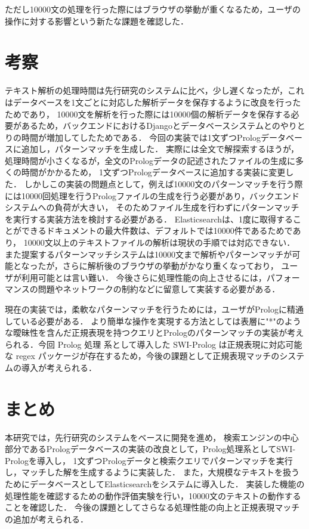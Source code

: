 \documentclass{FITpaper}
\begin{document}
  ただし10000文の処理を行った際にはブラウザの挙動が重くなるため，ユーザの操作に対する影響という新たな課題を確認した．
  
\section{考察}
  テキスト解析の処理時間は先行研究のシステムに比べ，少し遅くなったが，これはデータベースを1文ごとに対応した解析データを保存するように改良を行ったためであり，
  10000文を解析を行った際には10000個の解析データを保存する必要があるため，バックエンドにおけるDjangoとデータベースシステムとのやりとりの時間が増加してしたためである．
  今回の実装では1文ずつPrologデータベースに追加し，パターンマッチを生成した．
  実際には全文で解探索するほうが，処理時間が小さくなるが，全文のPrologデータの記述されたファイルの生成に多くの時間がかかるため，
  1文ずつPrologデータベースに追加する実装に変更した．
  しかしこの実装の問題点として，例えば10000文のパターンマッチを行う際には10000回処理を行うPrologファイルの生成を行う必要があり，バックエンドシステムへの負荷が大きい，
  そのためファイル生成を行わずにパターンマッチを実行する実装方法を検討する必要がある．
  Elasticsearchは、1度に取得することができるドキュメントの最大件数は、デフォルトでは10000件であるためであり，
  10000文以上のテキストファイルの解析は現状の手順では対応できない．
  また提案するパターンマッチシステムは10000文まで解析やパターンマッチが可能となったが，さらに解析後のブラウザの挙動がかなり重くなっており，
  ユーザが利用可能とは言い難い．
  今後さらに処理性能の向上させるには，パフォーマンスの問題やネットワークの制約などに留意して実装する必要がある．
  

  現在の実装では，柔軟なパターンマッチを行うためには，ユーザがPrologに精通している必要がある．
  より簡単な操作を実現する方法としては表層に"*"のような曖昧性を含んだ正規表現を持つクエリとPrologのパターンマッチの実装が考えられる．今回 Prolog 処理
系として導入した SWI-Prolog は正規表現に対応可能な regex パッケージが存在するため，今後の課題として正規表現マッチのシステムの導入が考えられる．

\section{まとめ}
  本研究では，先行研究のシステムをベースに開発を進め，
  検索エンジンの中心部分であるPrologデータベースの実装の改良として，Prolog処理系としてSWI-Prologを導入し，
  1文ずつPrologデータと検索クエリでパターンマッチを実行し，マッチした解を生成するように実装した．
  また，大規模なテキストを扱うためにデータベースとしてElasticsearchをシステムに導入した．
  実装した機能の処理性能を確認するための動作評価実験を行い，10000文のテキストの動作することを確認した．
  今後の課題としてさらなる処理性能の向上と正規表現マッチの追加が考えられる．







%

%
\end{document}
